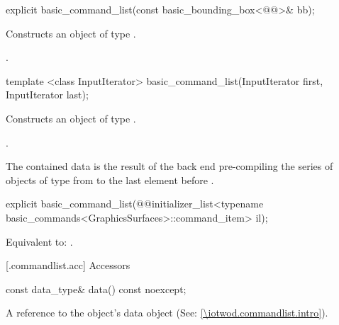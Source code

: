 %
\begin{itemdecl}
explicit basic_command_list(const basic_bounding_box<@\graphicsmathtemplparamnospace{}@>& bb);
\end{itemdecl}
\begin{itemdescr}
\pnum
\effects
Constructs an object of type .

\pnum
\postconditions
{}.
\end{itemdescr}

%
\begin{itemdecl}
template <class InputIterator>
basic_command_list(InputIterator first, InputIterator last);
\end{itemdecl}
\begin{itemdescr}
\pnum
\effects
Constructs an object of type .

\pnum
\postconditions
{}.

\pnum
\begin{note}
The contained data is the result of the back end pre-compiling the series of objects of type  from  to the last element before .
\end{note}
\end{itemdescr}

%
\begin{itemdecl}
explicit basic_command_list(@\stdqualifier{}@initializer_list<typename
  basic_commands<GraphicsSurfaces>::command_item> il);
\end{itemdecl}
\begin{itemdescr}
\pnum
\effects
Equivalent to: .
\end{itemdescr}

 [\iotwod.commandlist.acc] {Accessors}

%
\begin{itemdecl}
const data_type& data() const noexcept;
\end{itemdecl}
\begin{itemdescr}
\pnum
\returns A reference to the  object's data object (See: \ref{\iotwod.commandlist.intro}).
\end{itemdescr}
